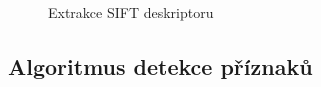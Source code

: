 	\begin{figure}[htp] 
		\caption{Extrakce SIFT deskriptoru} 	\label{sift_kp}
	\end{figure}
	
	\subsection{Algoritmus detekce příznaků}
	
